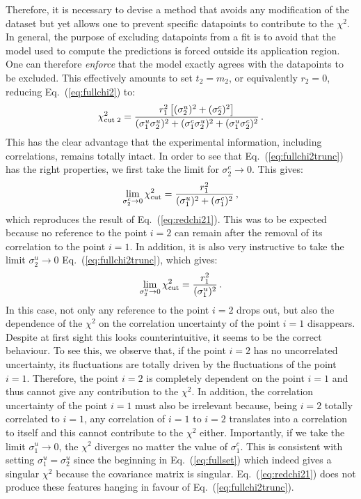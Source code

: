 \documentclass[10pt,a4paper]{article}
\begin{document}
Therefore, it is necessary to devise a method that avoids any
modification of the dataset but yet allows one to prevent specific
datapoints to contribute to the $\chi^2$. In general, the purpose of
excluding datapoints from a fit is to avoid that the model used to
compute the predictions is forced outside its application region. One
can therefore \textit{enforce} that the model exactly agrees with the
datapoints to be excluded. This effectively amounts to set $t_2=m_2$,
or equivalently $r_2=0$, reducing Eq.~(\ref{eq:fullchi2}) to:
\begin{equation}\label{eq:fullchi2trunc}
  \chi_{\rm cut\;2}^2= 
  \frac{r_1^2\left[(\sigma_2^u)^2+ (\sigma_2^c)^2\right]}{(\sigma_1^u \sigma_2^u)^2+ (\sigma_1^c \sigma_2^u)^2+ (\sigma_1^u \sigma_2^c)^2}\,.
\end{equation}
This has the clear advantage that the experimental information,
including correlations, remains totally intact. In order to see that
Eq.~(\ref{eq:fullchi2trunc}) has the right properties, we first take
the limit for $\sigma_2^c\rightarrow 0$. This gives:
\begin{equation}
  \lim_{\sigma_2^c\rightarrow 0}\chi_{\rm cut}^2= 
  \frac{r_1^2}{(\sigma_1^u)^2+ (\sigma_1^c)^2}\,,
\end{equation}
which reproduces the result of Eq.~(\ref{eq:redchi21}). This was to be
expected because no reference to the point $i=2$ can remain after the
removal of its correlation to the point $i=1$. In addition, it is also
very instructive to take the limit $\sigma_2^u\rightarrow 0$
Eq.~(\ref{eq:fullchi2trunc}), which gives:
\begin{equation}
\lim_{\sigma_2^u\rightarrow 0}\chi_{\rm cut}^2= 
\frac{r_1^2}{ (\sigma_1^u)^2}\,.
\end{equation}
In this case, not only any reference to the point $i=2$ drops out, but
also the dependence of the $\chi^2$ on the correlation uncertainty of
the point $i=1$ disappears. Despite at first sight this looks
counterintuitive, it seems to be the correct behaviour. To see this,
we observe that, if the point $i=2$ has no uncorrelated uncertainty,
its fluctuations are totally driven by the fluctuations of the point
$i=1$. Therefore, the point $i=2$ is completely dependent on the point
$i=1$ and thus cannot give any contribution to the $\chi^2$. In
addition, the correlation uncertainty of the point $i=1$ must also be
irrelevant because, being $i=2$ totally correlated to $i=1$, any
correlation of $i=1$ to $i=2$ translates into a correlation to itself
and this cannot contribute to the $\chi^2$ either. Importantly, if we
take the limit $\sigma_1^u\rightarrow 0$, the $\chi^2$ diverges no
matter the value of $\sigma_1^c$. This is consistent with setting
$\sigma_1^u=\sigma_2^u$ since the beginning in Eq.~(\ref{eq:fullset})
which indeed gives a singular $\chi^2$ because the covariance matrix
is singular. Eq.~(\ref{eq:redchi21}) does not produce these features
hanging in favour of Eq.~(\ref{eq:fullchi2trunc}).
\end{document}
